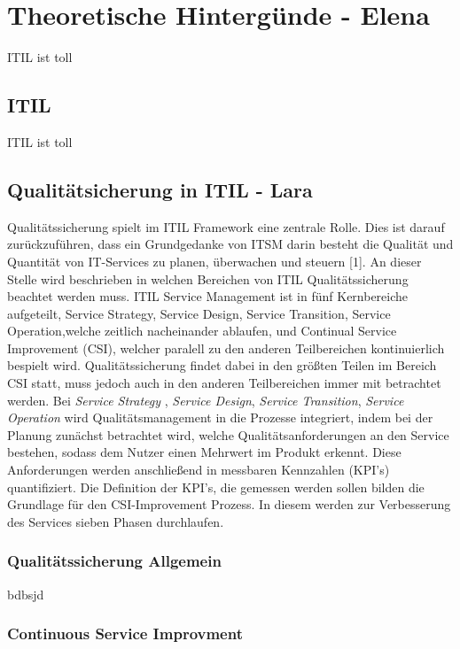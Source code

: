 \documentclass[sigconf]{acmart}
\begin{document}
\section{Theoretische Hintergünde - Elena}
ITIL ist toll

\subsection{ITIL}
ITIL ist toll

\subsection{Qualitätsicherung in ITIL - Lara}
Qualitätssicherung spielt im ITIL Framework eine zentrale Rolle.
Dies ist darauf zurückzuführen, dass ein Grundgedanke von ITSM
darin besteht die Qualität und Quantität von IT-Services zu planen,
überwachen und steuern [1]. An dieser Stelle wird beschrieben in
welchen Bereichen von ITIL Qualitätssicherung beachtet werden
muss.
ITIL Service Management ist in fünf Kernbereiche aufgeteilt, Service
Strategy, Service Design, Service Transition, Service Operation,welche
zeitlich nacheinander ablaufen, und Continual Service Improvement
(CSI), welcher paralell zu den anderen Teilbereichen kontinuierlich
bespielt wird. Qualitätssicherung findet dabei in den größten Teilen
im Bereich CSI statt, muss jedoch auch in den anderen Teilbereichen
immer mit betrachtet werden. Bei \textit{Service Strategy} , \textit{Service Design},
\textit{Service Transition}, \textit{Service Operation} wird Qualitätsmanagement
in die Prozesse integriert, indem bei der Planung zunächst betrachtet
wird, welche Qualitätsanforderungen an den Service bestehen,
sodass dem Nutzer einen Mehrwert im Produkt erkennt. Diese Anforderungen
werden anschließend in messbaren Kennzahlen (KPI’s)
quantifiziert. Die Definition der KPI’s, die gemessen werden sollen
bilden die Grundlage für den CSI-Improvement Prozess. In diesem
werden zur Verbesserung des Services sieben Phasen durchlaufen.

\subsubsection{Qualitätssicherung Allgemein}
bdbsjd

\subsubsection{Continuous Service Improvment}
\end{document}
